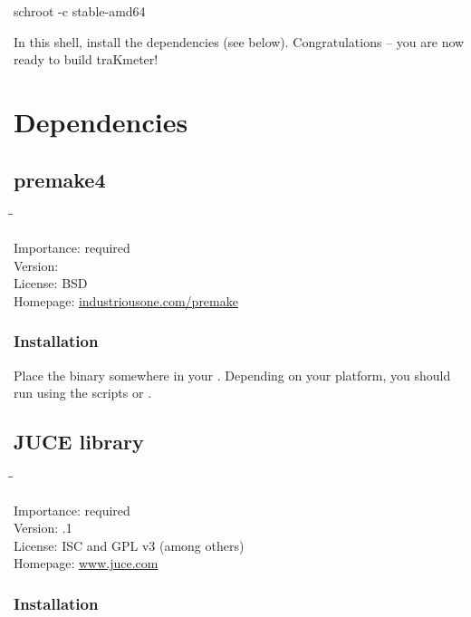 \begin{Verbatim64}
  schroot -c stable-amd64
\end{Verbatim64}

In this  shell, install the dependencies (see below).
Congratulations -- you are now ready to build traKmeter!

\section{Dependencies}

\subsection{premake4}

\begin{tabbing}
  \hspace*{6em}\=\=\kill

  Importance:  \> required \\
  Version:      \\
  License:     \> BSD \\
  Homepage:    \> \href{http://industriousone.com/premake}{industriousone.com/premake}
\end{tabbing}

\subsubsection{Installation}

Place the binary somewhere in your .  Depending on your
platform, you should run  using the scripts
 or .

\subsection{JUCE library}

\begin{tabbing}
  \hspace*{6em}\=\=\kill

  Importance:  \> required \\
  Version:     .1 \\
  License:     \> ISC and GPL v3 (among others) \\
  Homepage:    \> \href{http://www.juce.com/}{www.juce.com}
\end{tabbing}

\subsubsection{Installation}

